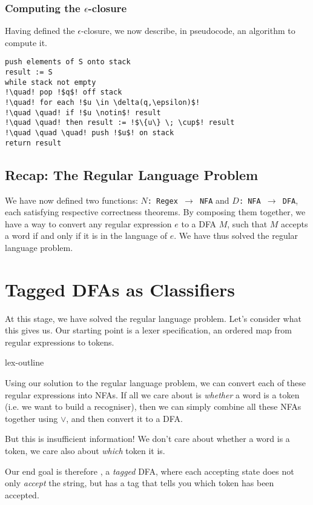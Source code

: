 \subsubsection{Computing the $\epsilon$-closure}
Having defined the $\epsilon$-closure, we now describe, in pseudocode, an algorithm to compute it.

\begin{lstlisting}[style=pseudocode]
push elements of S onto stack
result := S
while stack not empty
!\quad! pop !$q$! off stack
!\quad! for each !$u \in \delta(q,\epsilon)$!
!\quad \quad! if !$u \notin$! result
!\quad \quad! then result := !$\{u\} \; \cup$! result
!\quad \quad \quad! push !$u$! on stack
return result
\end{lstlisting}

\subsection{Recap: The Regular Language Problem}
We have now defined two functions: \texttt{$N$: Regex $\rightarrow$ NFA} and \texttt{$D$: NFA $\rightarrow$ DFA}, each satisfying respective correctness theorems. By composing them together, we have a way to convert any regular expression $e$ to a DFA $M$, such that $M$ accepts a word if and only if it is in the language of $e$. We have thus solved the regular language problem.

\section{Tagged DFAs as Classifiers}
At this stage, we have solved the regular language problem. Let's consider what this gives us. Our starting point is a lexer specification, an ordered map from regular expressions to tokens.
\begin{center}
    {lex-outline}
\end{center}

Using our solution to the regular language problem, we can convert each of these regular expressions into NFAs. If all we care about is \emph{whether} a word is a token (i.e. we want to build a recogniser), then we can simply combine all these NFAs together using $\lor$, and then convert it to a DFA. 

But this is insufficient information! We don't care about whether a word is a token, we care also about \emph{which} token it is.

Our end goal is therefore , a \emph{tagged} DFA, where each accepting state does not only \emph{accept} the string, but has a tag that tells you which token has been accepted.

